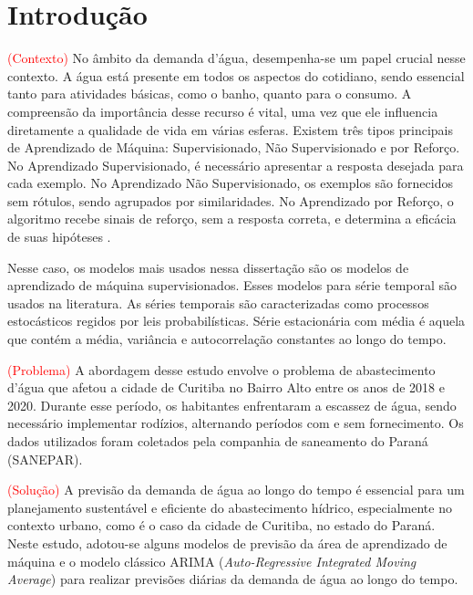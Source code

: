 



\section{Introdu{\c c}{\~a}o} \label{sec:int}


\textcolor{red}{(Contexto)} No âmbito da demanda d'água, desempenha-se um papel crucial nesse contexto. A água está presente em todos os aspectos do cotidiano, sendo essencial tanto para atividades básicas, como o banho, quanto para o consumo. A compreensão da importância desse recurso é vital, uma vez que ele influencia diretamente a qualidade de vida em várias esferas.
Existem três tipos principais de Aprendizado de Máquina: Supervisionado, Não Supervisionado e por Reforço. No Aprendizado Supervisionado, é necessário apresentar a resposta desejada para cada exemplo. No Aprendizado Não Supervisionado, os exemplos são fornecidos sem rótulos, sendo agrupados por similaridades. No Aprendizado por Reforço, o algoritmo recebe sinais de reforço, sem a resposta correta, e determina a eficácia de suas hipóteses \cite{Silva2021}.

Nesse caso, os modelos mais usados nessa dissertação são os modelos de aprendizado de máquina supervisionados. Esses modelos para série temporal são usados na literatura.
As séries temporais são caracterizadas como processos estocásticos regidos por leis probabilísticas.
Série estacionária com média é aquela que contém a média, variância e autocorrelação constantes ao longo do tempo.



%

%
\textcolor{red}{(Problema)} A abordagem desse estudo envolve o problema de abastecimento d'água que afetou a cidade de Curitiba no Bairro Alto entre os anos de 2018 e 2020. Durante esse período, os habitantes enfrentaram a escassez de água, sendo necessário implementar rodízios, alternando períodos com e sem fornecimento. Os dados utilizados foram coletados pela companhia de saneamento do Paraná (SANEPAR).


\textcolor{red}{(Solução)} A previsão da demanda de água ao longo do tempo é essencial para um planejamento sustentável e eficiente do abastecimento hídrico, especialmente no contexto urbano, como é o caso da cidade de Curitiba, no estado do Paraná. Neste estudo, adotou-se alguns modelos de previsão da área de aprendizado de máquina e o modelo clássico ARIMA (\textit{Auto-Regressive Integrated Moving Average}) para realizar previsões diárias da demanda de água ao longo do tempo.


